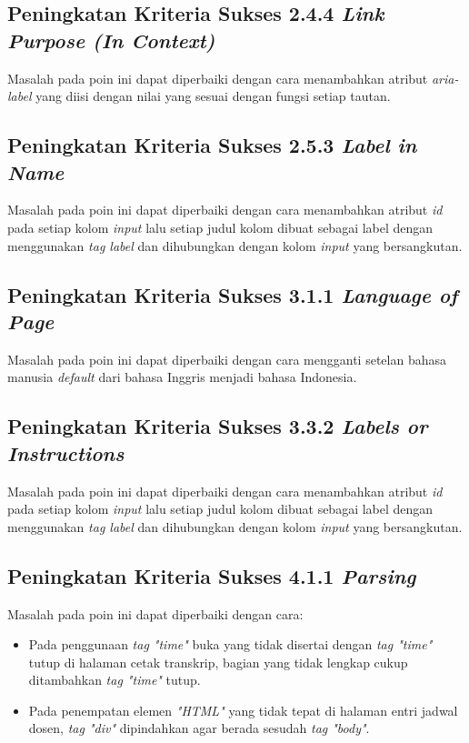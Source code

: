 \subsection{Peningkatan Kriteria Sukses 2.4.4 \textit{Link Purpose (In Context)}}
\label{subsec:peningkatan_kriteria_sukses_2.4.4}
Masalah pada poin ini dapat diperbaiki dengan cara menambahkan atribut \textit{aria-label} yang diisi dengan nilai yang sesuai dengan fungsi setiap tautan.

\subsection{Peningkatan Kriteria Sukses 2.5.3 \textit{Label in Name}}
\label{subsec:peningkatan_kriteria_sukses_2.5.3}
Masalah pada poin ini dapat diperbaiki dengan cara menambahkan atribut \textit{id} pada setiap kolom \textit{input} lalu setiap judul kolom dibuat sebagai label dengan menggunakan \textit{tag label} dan dihubungkan dengan kolom \textit{input} yang bersangkutan.

\subsection{Peningkatan Kriteria Sukses 3.1.1 \textit{Language of Page}}
\label{subsec:peningkatan_kriteria_sukses_3.1.1}
Masalah pada poin ini dapat diperbaiki dengan cara mengganti setelan bahasa manusia \textit{default} dari bahasa Inggris menjadi bahasa Indonesia.

\subsection{Peningkatan Kriteria Sukses 3.3.2 \textit{Labels or Instructions}}
\label{subsec:peningkatan_kriteria_sukses_3.3.2}
Masalah pada poin ini dapat diperbaiki dengan cara menambahkan atribut \textit{id} pada setiap kolom \textit{input} lalu setiap judul kolom dibuat sebagai label dengan menggunakan \textit{tag label} dan dihubungkan dengan kolom \textit{input} yang bersangkutan.

\subsection{Peningkatan Kriteria Sukses 4.1.1 \textit{Parsing}}
\label{subsec:peningkatan_kriteria_sukses_4.1.1}
Masalah pada poin ini dapat diperbaiki dengan cara:

\begin{itemize}
    \item Pada penggunaan \textit{tag "time"} buka yang tidak disertai dengan \textit{tag "time"} tutup di halaman cetak transkrip, bagian yang tidak lengkap cukup ditambahkan \textit{tag "time"} tutup.
    \item Pada penempatan elemen \textit{"HTML"} yang tidak tepat di halaman entri jadwal dosen, \textit{tag "div"} dipindahkan agar berada sesudah \textit{tag "body"}.
\end{itemize}